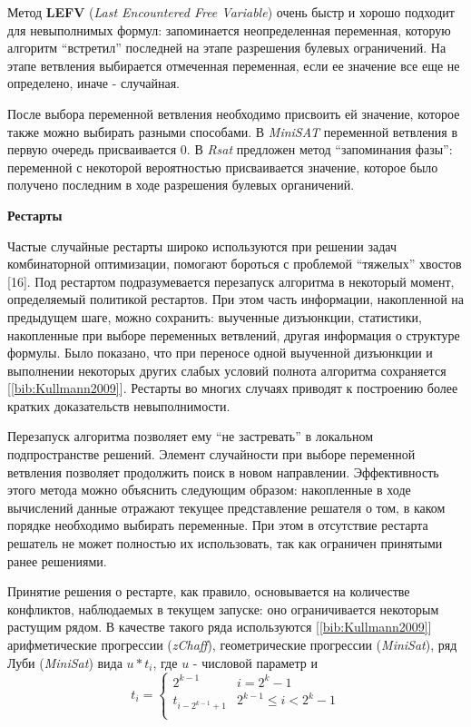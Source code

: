 Метод \textbf{LEFV} (\textit{Last Encountered Free Variable}) очень быстр и хорошо подходит для невыполнимых формул: запоминается неопределенная переменная, которую алгоритм \enquote{встретил} последней на этапе разрешения булевых ограничений. На этапе ветвления выбирается отмеченная переменная, если ее значение все еще не определено, иначе - случайная.

После выбора переменной ветвления необходимо присвоить ей значение, которое также можно выбирать разными способами. В \textit{MiniSAT} переменной ветвления в первую очередь присваивается $0$. В \textit{Rsat} предложен метод \enquote{запоминания фазы}: переменной с некоторой вероятностью присваивается значение, которое было получено последним в ходе разрешения булевых органичений.

\textbf{Рестарты}

Частые случайные рестарты широко используются при решении задач комбинаторной оптимизации, помогают бороться с проблемой \enquote{тяжелых} хвостов [16]. Под рестартом подразумевается перезапуск алгоритма в некоторый момент, определяемый политикой рестартов. При этом часть информации, накопленной на предыдущем шаге, можно сохранить: выученные дизъюнкции, статистики, накопленные при выборе переменных ветвлений, другая информация о структуре формулы. Было показано, что при переносе одной выученной дизъюнкции и выполнении некоторых других слабых условий полнота алгоритма сохраняется [\ref{bib:Kullmann2009}]. Рестарты во многих случаях приводят к построению более кратких доказательств невыполнимости.

Перезапуск алгоритма позволяет ему \enquote{не застревать} в локальном подпространстве решений. Элемент случайности при выборе переменной ветвления позволяет продолжить поиск в новом направлении. Эффективность этого метода можно объяснить следующим образом: накопленные в ходе вычислений данные отражают текущее представление решателя о том, в каком порядке необходимо выбирать переменные. При этом в отсутствие рестарта решатель не может полностью их использовать, так как ограничен принятыми ранее решениями.

Принятие решения о рестарте, как правило, основывается на количестве конфликтов, наблюдаемых в текущем запуске: 
оно ограничивается некоторым растущим рядом. В качестве такого ряда используются [\ref{bib:Kullmann2009}] арифметические прогрессии (\textit{zChaff}), геометрические прогрессии (\textit{MiniSat}), ряд Луби (\textit{MiniSat}) вида $u * t_i$, где $u$ - числовой параметр и 
\begin{equation*}
t_i = 
\begin{cases}
2^{k-1} & i = 2^k - 1 \\
t_{i - 2^{k-1} + 1} & 2^{k-1} \leq i < 2^k - 1 \\
\end{cases}
\end{equation*}

